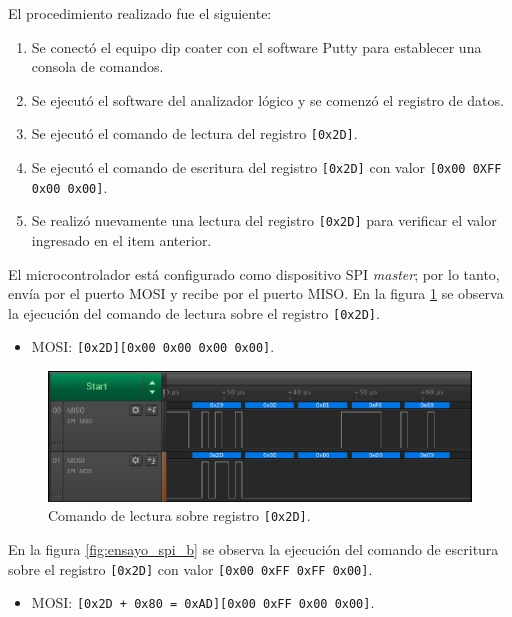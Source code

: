 El procedimiento realizado fue el siguiente:
\begin{enumerate}
\item Se conectó el equipo dip coater con el software Putty para establecer una consola de comandos.
\item Se ejecutó el software del analizador lógico y se comenzó el registro de datos.
\item Se ejecutó el comando de lectura del registro \texttt{[0x2D]}.
\item Se ejecutó el comando de escritura del registro \texttt{[0x2D]} con valor \texttt{[0x00 0XFF 0x00 0x00]}.
\item Se realizó nuevamente una lectura del registro \texttt{[0x2D]} para verificar el valor ingresado en el item anterior. 
\end{enumerate}

El microcontrolador está configurado como dispositivo SPI \textit{master}; por lo tanto, envía por el puerto MOSI y recibe por el puerto MISO.
En la figura \ref{fig:ensayo_spi_a} se observa la ejecución del comando de lectura sobre el registro \texttt{[0x2D]}. 
\begin{itemize}
\item MOSI: \texttt{[0x2D][0x00 0x00 0x00 0x00]}.
\end{itemize}



\begin{figure}[h!]
\centering 
\includegraphics[width=1\textwidth]{./Figures/ensayo_spi_a_v1.png}
\caption{Comando de lectura sobre registro \texttt{[0x2D]}.}
\label{fig:ensayo_spi_a}
\end{figure}


En la figura \ref{fig:ensayo_spi_b} se observa la ejecución del comando de escritura sobre el registro \texttt{[0x2D]} con valor \texttt{[0x00 0xFF 0xFF 0x00]}. 

\begin{itemize}
\item MOSI: \texttt{[0x2D + 0x80 = 0xAD][0x00 0xFF 0x00 0x00]}.
\end{itemize}



